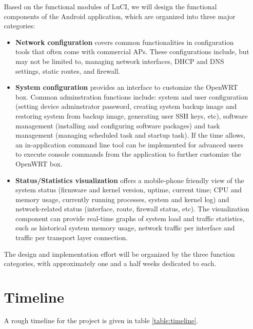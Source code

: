 \documentclass{sig-alternate-05-2015}
\begin{document}
	Based on the functional modules of LuCI, we will design the functional components of the Android application, which are organized into three major categories:
	
	\begin{itemize}
		
		\item
		\textbf{Network configuration} covers common functionalities in configuration tools that often come with commercial APs. These configurations include, but may not be limited to, managing network interfaces, DHCP and DNS settings, static routes, and firewall.
		
		\item
		\textbf{System configuration} provides an interface to customize the OpenWRT box. Common adminstration functions include: system and user configuration (setting device adminstrator password, creating system backup image and restoring system from backup image, generating user SSH keys, etc), software management (installing and configuring software packages) and task management (managing scheduled task and startup task). If the time allows, an in-application command line tool can be implemented for advanced users to execute console commands from the application to further customize the OpenWRT box.
		
		\item
		\textbf{Status/Statistics visualization} offers a mobile-phone friendly view of the system status (firmware and kernel version, uptime, current time; CPU and memory usage, currently running processes, system and kernel log) and network-related status (interface, route, firewall status, etc). The visualization component can provide real-time graphs of system load and traffic statistics, such as historical system memory usage, network traffic per interface and traffic per transport layer connection.
		
	\end{itemize}
	
	The design and implementation effort will be organized by the three function categories, with approximately one and a half weeks dedicated to each.
	
	\section{Timeline}
	
	A rough timeline for the project is given in table \ref{table:timeline}.
	
\end{document}
